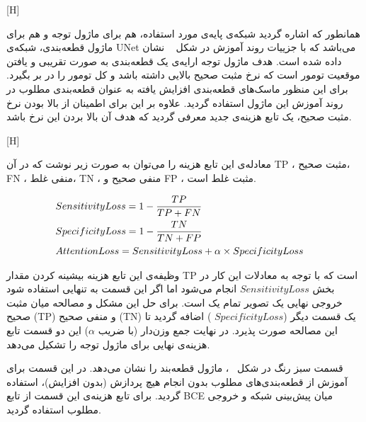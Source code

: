 [H]


همانطور که اشاره گردید شبکه‌ی پایه‌ی مورد استفاده، هم برای ماژول توجه و هم برای ماژول قطعه‌بندی، شبکه‌ی UNet می‌باشد که با جزییات روند آموزش در شکل ~ نشان داده شده است. هدف ماژول توجه ارایه‌ی یک قطعه‌بندی به صورت تقریبی و یافتن موقعیت تومور است که نرخ مثبت صحیح بالایی داشته باشد و کل تومور را در بر بگیرد. برای این منظور ماسک‌های قطعه‌بندی افزایش یافته به عنوان قطعه‌بندی مطلوب در روند آموزش این ماژول استفاده گردید. علاوه بر این برای اطمینان از بالا بودن نرخ مثبت صحیح، یک تابع هزینه‌ی جدید معرفی گردید که هدف آن بالا بردن این نرخ باشد. 

[H]

معادله‌ی این تابع هزینه را می‌توان به صورت زیر نوشت که در آن TP ، مثبت صحیح، FN ، منفی غلط، TN ، منفی صحیح و FP ، مثبت غلط است. 

\begin{alignat}{5}
	&SensitivityLoss = 1-\frac{TP}{TP+FN}  \notag && \\
	&SpecificityLoss = 1-\frac{TN}{TN+FP} \notag && \\
	&AttentionLoss = SensitivityLoss + \alpha \times SpecificityLoss \label{attloss} && 
\end{alignat}

وظیفه‌ی این تابع هزینه بیشینه کردن مقدار TP است که با توجه به معادلات این کار در بخش $SensitivityLoss$ انجام می‌شود اما اگر این قسمت به تنهایی استفاده شود خروجی نهایی یک تصویر تمام یک است. برای حل این مشکل و مصالحه میان مثبت صحیح (TP) و منفی صحیح (TN) یک قسمت دیگر ($SpecificityLoss$ ) اضافه گردید تا این مصالحه صورت پذیرد. در نهایت جمع وزن‌دار (با ضریب $\alpha$) این دو قسمت تابع هزینه‌ی نهایی برای ماژول توجه را تشکیل می‌دهد.


قسمت سبز رنگ در شکل ~، ماژول قطعه‌بند را نشان می‌دهد. در این قسمت برای آموزش از قطعه‌بندی‌های مطلوب بدون انجام هیچ پردازش (بدون افزایش)، استفاده گردید. برای تابع هزینه‌ی این قسمت از تابع BCE میان پیش‌بینی شبکه و خروجی مطلوب استفاده گردید. 

